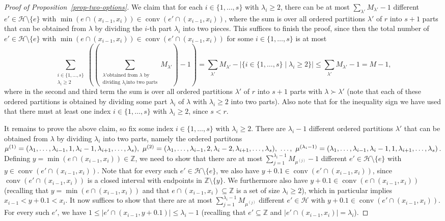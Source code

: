 \documentclass{aic}
\theoremstyle{definition}
\numberwithin{equation}{section}
\numberwithin{figure}{section}
\newcommand{\su}{\subseteq}
\newcommand{\sm}{\setminus}
\newcommand{\Z}{\mathbb{Z}}
\newcommand{\HH}{\mathcal{H}}
\newcommand{\conv}{\operatorname{conv}}
\begin{document}
\begin{proof}[Proof of Proposition~\ref{prop-two-options}]
We claim that for each $i\in\{1,\dots,s\}$ with $\lambda_i\ge 2$, there can be at most $\sum_{\lambda'} M_{\lambda'}-1$ different $e'\in\HH\sm\{e\}$ with $\min(e\cap (x_{i-1},x_i))\in \conv(e'\cap (x_{i-1},x_i))$, where the sum is over all ordered partitions $\lambda'$ of $r$ into $s+1$ parts that can be obtained from $\lambda$ by dividing the $i$-th part $\lambda_i$ into two pieces. This suffices to finish the proof, since then the total number of $e'\in\HH\sm\{e\}$ with $\min(e\cap (x_{i-1},x_i))\in \conv(e'\cap (x_{i-1},x_i))$ for some $i\in\{1,\dots,s\}$ is at most
\[\sum_{\substack{i\in\{1,\dots,s\}\\\lambda_i\ge 2}}\left(\left(\sum_{\substack{\lambda'\text{obtained from }\lambda\text{ by}\\\text{dividing }\lambda_i\text{into two parts}}}\!\!M_{\lambda'}\right)-1\right)=\sum_{\lambda'} M_{\lambda'}-|\{i\in\{1,\dots,s\}\mid \lambda_i\ge 2\}|\le \sum_{\lambda'} M_{\lambda'}-1=M-1,\]
where in the second and third term the sum is over all ordered partitions $\lambda'$ of $r$ into $s+1$ parts with $\lambda\succ\lambda'$ (note that each of these ordered partitions is obtained by dividing some part $\lambda_i$ of $\lambda$ with $\lambda_i\ge 2$ into two parts). Also note that for the inequality sign we have used that there must at least one index $i\in \{1,\dots,s\}$ with $\lambda_i\ge 2$, since $s<r$.

It remains to prove the above claim, so fix some index $i\in\{1,\dots,s\}$ with $\lambda_i\ge 2$. There are $\lambda_i-1$ different ordered partitions $\lambda'$ that can be obtained from $\lambda$ by dividing $\lambda_i$ into two parts, namely the ordered partitons $\mu^{(1)}=(\lambda_1,\dots,\lambda_{i-1},1,\lambda_i-1,\lambda_{i+1},\dots,\lambda_s), \ \mu^{(2)}=(\lambda_1,\dots,\lambda_{i-1},2,\lambda_i-2,\lambda_{i+1},\dots,\lambda_s),\ \dots,\ \linebreak \mu^{(\lambda_i-1)}=(\lambda_1,\dots,\lambda_{i-1},\lambda_i-1,1,\lambda_{i+1},\dots,\lambda_s)$. Defining $y=\min(e\cap (x_{i-1},x_i))\in \Z$, we need to show that there are at most $\sum_{j=1}^{\lambda_i-1} M_{\mu^{(j)}}-1$ different $e'\in\HH\sm\{e\}$ with $y\in \conv(e'\cap (x_{i-1},x_i))$. Note that for every such $e'\in\HH\sm\{e\}$, we also have $y+0.1\in \conv(e'\cap (x_{i-1},x_i))$, since $\conv(e'\cap (x_{i-1},x_i))$ is a closed interval with endpoints in $\Z\sm\{y\}$. We furthermore also have $y+0.1\in \conv(e\cap (x_{i-1},x_i))$ (recalling that $y=\min(e\cap (x_{i-1},x_i))$ and that $e\cap (x_{i-1},x_i)\su \Z$ is a set of size $\lambda_i\ge 2$), which in particular implies $x_{i-1}<y+0.1<x_i$. It now suffices to show that there are at most $\sum_{j=1}^{\lambda_i-1} M_{\mu^{(j)}}$ different $e'\in\HH$ with $y+0.1\in \conv(e'\cap (x_{i-1},x_i))$. For every such $e'$, we have $1\le |e'\cap (x_{i-1},y+0.1)|\le \lambda_i-1$ (recalling that $e'\su \Z$ and $|e'\cap (x_{i-1},x_i)|=\lambda_i$).


\end{proof}
\end{document}
